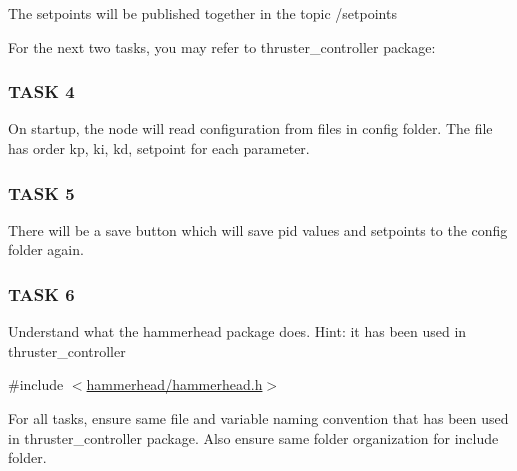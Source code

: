 The setpoints will be published together in the topic {\ttfamily /setpoints}

For the next two tasks, you may refer to {\ttfamily thruster\+\_\+controller} package\+:

\subsubsection*{T\+A\+SK 4}

On startup, the node will read configuration from files in {\ttfamily config} folder. The file has order kp, ki, kd, setpoint for each parameter.

\subsubsection*{T\+A\+SK 5}

There will be a save button which will save pid values and setpoints to the {\ttfamily config} folder again.

\subsubsection*{T\+A\+SK 6}

Understand what the {\ttfamily hammerhead} package does. Hint\+: it has been used in {\ttfamily thruster\+\_\+controller}

{\ttfamily \#include $<$\hyperlink{hammerhead_8h}{hammerhead/hammerhead.\+h}$>$}

For all tasks, ensure same file and variable naming convention that has been used in {\ttfamily thruster\+\_\+controller} package. Also ensure same folder organization for include folder. 